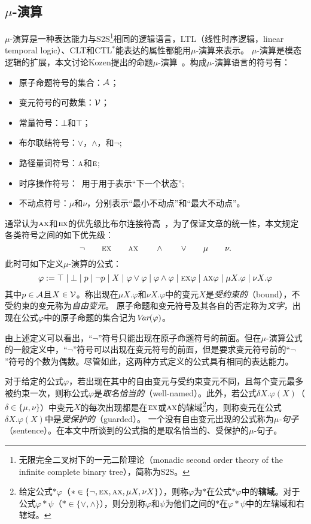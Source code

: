 \subsection{$\mu$-演算}
$\mu$-演算是一种表达能力与S2S\footnote{无限完全二叉树下的一元二阶理论（monadic second order theory of the infinite complete binary tree），简称为S2S。}相同的逻辑语言，LTL（线性时序逻辑，linear temporal logic）、CLT和CTL$^*$能表达的属性都能用$\mu$-演算来表示。
$\mu$-演算是模态逻辑的扩展，本文讨论Kozen提出的命题$\mu$-演算~\cite{DBLP:journals/cacm/Kozen83}。构成$\mu$-演算语言的符号有：
\begin{itemize}
	\item 原子命题符号的集合：$\cal A$；
	\item 变元符号的可数集：$\cal V$；
	\item 常量符号：$\bot$和$\top$；
	\item 布尔联结符号：$\vee$，$\wedge$，和$\neg$;
	\item 路径量词符号：$\textsc{a}$和$\textsc{e}$;
	\item 时序操作符号：\NEXT\ 用于用于表示“下一个状态”;
	\item 不动点符号：$\mu$和$\nu$，分别表示“最小不动点”和“最大不动点”。
\end{itemize}

通常认为$\textsc{a}\textsc{x}$和$\textsc{e}\textsc{x}$的优先级比布尔连接符高~\cite{bradfield2018mu}，为了保证文章的统一性，本文规定各类符号之间的如下优先级：
\[
\neg\qquad \textsc{e}\textsc{x}\qquad \textsc{a}\textsc{x}\qquad \wedge\qquad \vee\qquad \mu\qquad \nu.
\]
此时可如下定义$\mu$-演算的公式：
\[
\varphi := \top \mid \bot \mid p\mid \neg p\mid  X\mid \varphi \vee \varphi \mid \varphi \wedge \varphi \mid \textsc{e}\textsc{x} \varphi\mid \textsc{a}\textsc{x} \varphi \mid \mu X. \varphi\mid \nu X. \varphi
\]
其中$p\in {\cal A}$且$X\in {\cal V}$。称出现在$\mu X. \varphi$和$\nu X. \varphi$中的变元$X$是\emph{受约束的}（bound），不受约束的变元称为\emph{自由变元}。
原子命题和变元符号及其各自的否定称为\emph{文字}，出现在公式$\varphi$中的原子命题的集合记为$\textit{Var}(\varphi)$。

由上述定义可以看出，“$\neg$”符号只能出现在原子命题符号的前面。但在$\mu$-演算公式的一般定义中，“$\neg$”符号可以出现在变元符号的前面，但是要求变元符号前的“$\neg$”符号的个数为偶数。尽管如此，这两种方式定义的公式具有相同的表达能力。

对于给定的公式$\varphi$，若出现在其中的自由变元与受约束变元不同，且每个变元最多被约束一次，则称公式$\varphi$是\emph{取名恰当的}（well-named）。此外，若公式$\delta X.\varphi(X)$（$\delta \in \{\mu, \nu\}$）中变元$X$的每次出现都是在$\textsc{e}\textsc{x}$或$\textsc{a}\textsc{x}$的辖域\footnote{给定公式$*\varphi$（$*\in \{\neg, \textsc{e}\textsc{x},\textsc{a}\textsc{x}, \mu X, \nu X\}$），则称$\varphi$为$*$在公式$*\varphi$中的\textbf{辖域}。对于公式$\varphi * \psi$（$*\in \{\vee, \wedge\}$），则分别称$\varphi$和$\psi$为他们之间的$*$在$\varphi * \psi$中的左辖域和右辖域。}内，则称变元在公式$\delta X.\varphi(X)$中是\emph{受保护的}（guarded）。
一个没有自由变元出现的公式称为\emph{$\mu$-句子}（sentence）。在本文中所谈到的公式指的是取名恰当的、受保护的$\mu$-句子。

